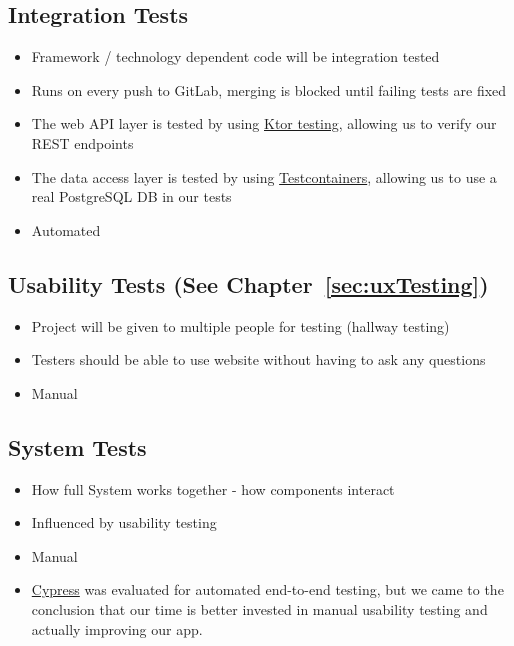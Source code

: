 \subsection{Integration Tests}
\begin{itemize}
    \item Framework / technology dependent code will be integration tested
    \item Runs on every push to GitLab, merging is blocked until failing tests are fixed
    \item The web API layer is tested by using \href{https://ktor.io/docs/testing.html}{Ktor testing}, allowing us to verify our REST endpoints
    \item The data access layer is tested by using \href{https://www.testcontainers.org/}{Testcontainers}, allowing us to use a real PostgreSQL DB in our tests
    \item Automated
\end{itemize}

\subsection{Usability Tests (See Chapter~\ref{sec:uxTesting})}
\begin{itemize}
    \item Project will be given to multiple people for testing (hallway testing)
    \item Testers should be able to use website without having to ask any questions
    \item Manual
\end{itemize}

\subsection{System Tests}
\begin{itemize}
    \item How full System works together - how components interact
    \item Influenced by usability testing
    \item Manual
    \item \href{https://www.cypress.io}{Cypress} was evaluated for automated end-to-end testing, but we came to the conclusion that our time is better invested in manual usability testing and actually improving our app.
\end{itemize}

